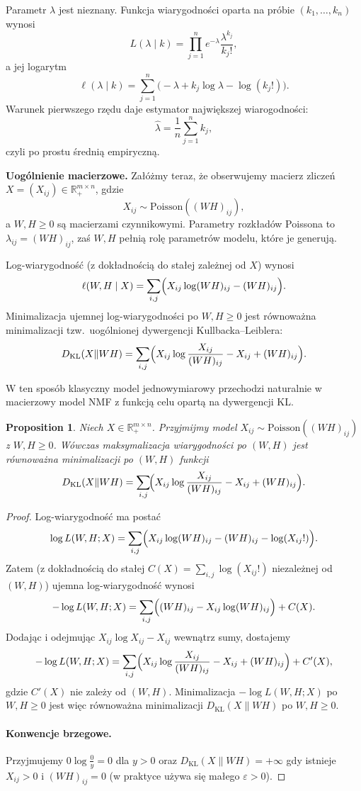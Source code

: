 \documentclass[12pt]{article}
\newtheorem{proposition}[theorem]{Proposition}
\begin{document}
Parametr $\lambda$ jest nieznany. Funkcja wiarygodności oparta
na próbie $(k_1,\ldots,k_n)$ wynosi
\[
L(\lambda\mid k)=\prod_{j=1}^n e^{-\lambda}\frac{\lambda^{k_j}}{k_j!},
\]
a jej logarytm
\[
\ell(\lambda\mid k)=\sum_{j=1}^n\bigl(-\lambda+k_j\log\lambda-\log(k_j!)\bigr).
\]
Warunek pierwszego rzędu daje estymator największej wiarogodności:
\[
\hat{\lambda}=\frac{1}{n}\sum_{j=1}^n k_j,
\]
czyli po prostu średnią empiryczną.

\bigskip
\noindent
\textbf{Uogólnienie macierzowe.}
Załóżmy teraz, że obserwujemy macierz zliczeń
$X=(X_{ij})\in\mathbb{R}_+^{m\times n}$, gdzie
\[
X_{ij}\sim \mathrm{Poisson}((WH)_{ij}),
\]
a $W,H\ge 0$ są macierzami czynnikowymi. Parametry rozkładów
Poissona to $\lambda_{ij}=(WH)_{ij}$, zaś $W,H$ pełnią rolę
parametrów modelu, które je generują.

Log-wiarygodność (z dokładnością do stałej zależnej od $X$) wynosi
\[
\ell(W,H\mid X)=\sum_{i,j}\Bigl(X_{ij}\log(WH)_{ij}-(WH)_{ij}\Bigr).
\]
Minimalizacja ujemnej log-wiarygodności po $W,H\ge 0$ jest równoważna
minimalizacji tzw.~uogólnionej dywergencji Kullbacka--Leiblera:
\[
D_{\mathrm{KL}}(X\|WH)=\sum_{i,j}\Bigl(X_{ij}\log\frac{X_{ij}}{(WH)_{ij}}
-X_{ij}+(WH)_{ij}\Bigr).
\]

\medskip
\noindent
W ten sposób klasyczny model jednowymiarowy przechodzi naturalnie
w macierzowy model NMF z funkcją celu opartą na dywergencji KL.

\begin{proposition}
Niech $X\in\mathbb{R}_+^{m\times n}$. Przyjmijmy model
$X_{ij}\sim\mathrm{Poisson}((WH)_{ij})$ z $W,H\ge 0$.
Wówczas maksymalizacja wiarygodności po $(W,H)$ jest równoważna
minimalizacji po $(W,H)$ funkcji
\[
D_{\mathrm{KL}}(X\|WH)
=\sum_{i,j}\!\Bigl(X_{ij}\log\frac{X_{ij}}{(WH)_{ij}}-X_{ij}+(WH)_{ij}\Bigr).
\]
\end{proposition}

\begin{proof}
Log-wiarygodność ma postać
\[
\log L(W,H;X)=\sum_{i,j}\Bigl(X_{ij}\log(WH)_{ij}-(WH)_{ij}-\log(X_{ij}!)\Bigr).
\]
Zatem (z dokładnością do stałej $C(X)=\sum_{i,j}\log(X_{ij}!)$ niezależnej od $(W,H)$)
ujemna log-wiarygodność wynosi
\[
-\log L(W,H;X)=\sum_{i,j}\Bigl((WH)_{ij}-X_{ij}\log(WH)_{ij}\Bigr)+C(X).
\]
Dodając i odejmując $X_{ij}\log X_{ij}-X_{ij}$ wewnątrz sumy, dostajemy
\[
-\log L(W,H;X)=
\sum_{i,j}\Bigl(X_{ij}\log\frac{X_{ij}}{(WH)_{ij}}-X_{ij}+(WH)_{ij}\Bigr)+C'(X),
\]
gdzie $C'(X)$ nie zależy od $(W,H)$. Minimalizacja $-\log L(W,H;X)$
po $W,H\ge 0$ jest więc równoważna minimalizacji $D_{\mathrm{KL}}(X\|WH)$
po $W,H\ge 0$.


\paragraph{Konwencje brzegowe.}
Przyjmujemy $0\log\frac{0}{y}=0$ dla $y>0$ oraz $D_{\mathrm{KL}}(X\|WH)=+\infty$
gdy istnieje $X_{ij}>0$ i $(WH)_{ij}=0$ (w praktyce używa się małego $\varepsilon>0$).

\smallskip

\end{proof}
\end{document}
